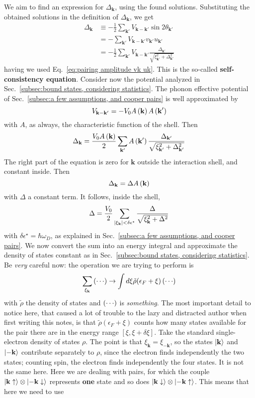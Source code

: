 We aim to find an expression for $\Delta_\mathbf{k}$, using the found solutions. Substituting the obtained solutions in the definition of $\Delta_\mathbf{k}$, we get
\begin{align}
	\Delta_\mathbf{k} &\equiv - \frac{1}{2} 
	\sum_{\mathbf{k}'} V_{\mathbf{k}-\mathbf{k}'} \sin2\theta_{\mathbf{k}'} \nonumber \\
	&= - \sum_{\mathbf{k}'} V_{\mathbf{k}-\mathbf{k}'} v_{\mathbf{k}'} u_{\mathbf{k}'} \nonumber \\
	&= - \frac{1}{2} \sum_{\mathbf{k}'} V_{\mathbf{k}-\mathbf{k}'} \frac{\Delta_{\mathbf{k}'}}{\sqrt{\xi_{\mathbf{k}'}^2 + \Delta_{\mathbf{k}'}^2}} \label{eq:mean field self consistency equation}
\end{align}
having we used Eq.~\eqref{eq:pairing amplitude vk uk}. This is the so-called \textbf{self-consistency equation}. Consider now the potential analyzed in Sec.~\ref{subsec:bound states, considering statistics}. The phonon effective potential of Sec.~\ref{subsec:a few assumptions, and cooper pairs} is well approximated by
\[
	V_{\mathbf{k}-\mathbf{k}'} = - V_0 A\left({\mathbf{k}}\right) A\left({\mathbf{k}'}\right)
\]
with $A$, as always, the characteristic function of the shell. Then
\[
	\Delta_\mathbf{k} = \frac{V_0 A\left({\mathbf{k}}\right)}{2} \sum_{\mathbf{k}'} A\left({\mathbf{k}'}\right) \frac{\Delta_{\mathbf{k}'}}{\sqrt{\xi_{\mathbf{k}'}^2 + \Delta_{\mathbf{k}'}^2}}
\]
The right part of the equation is zero for $\mathbf{k}$ outside the interaction shell, and constant inside. Then
\[
	\Delta_\mathbf{k} = \Delta A\left({\mathbf{k}}\right)
\]
with $\Delta$ a constant term. It follows, inside the shell,
\[
	\Delta = \frac{V_0}{2} \sum_{\abs{\xi_\mathbf{k}}<\delta\epsilon^\star} \frac{\Delta}{\sqrt{\xi_\mathbf{k}^2 + \Delta^2}}
\]
with $\delta\epsilon^\star = \hbar\omega_D$, as explained in Sec.~\ref{subsec:a few assumptions, and cooper pairs}. We now convert the sum into an energy integral and approximate the density of states constant as in Sec.~\ref{subsec:bound states, considering statistics}. Be \textit{very} careful now: the operation we are trying to perform is
\[
	\sum_{\xi_\mathbf{k}} \left({\cdots}\right) \to \int d\xi \tilde{\rho}(\epsilon_F+\xi) \left({\cdots}\right)
\]
with $\tilde{\rho}$ the density of states and $\left({\cdots}\right)$ is \textit{something}. The most important detail to notice here, that caused a lot of trouble to the lazy and distracted author when first writing this notes, is that $\tilde{\rho}(\epsilon_F+\xi)$ counts how many states available for the pair there are in the energy range $[\xi,\xi+\delta\xi]$. Take the standard single-electron density of states $\rho$. The point is that $\xi_\mathbf{k} = \xi_{-\mathbf{k}}$, so the states $\ket{\mathbf{k}}$ and $\ket{-\mathbf{k}}$ contribute separately to $\rho$, since the electron finds independently the two states; counting spin, the electron finds independently the four states. It is not the same here. Here we are dealing with pairs, for which the couple $\ket{\mathbf{k}\uparrow} \otimes \ket{-\mathbf{k}\downarrow}$ represents \textbf{one} state and so does $\ket{\mathbf{k}\downarrow} \otimes \ket{-\mathbf{k}\uparrow}$. This means that here we need to use
